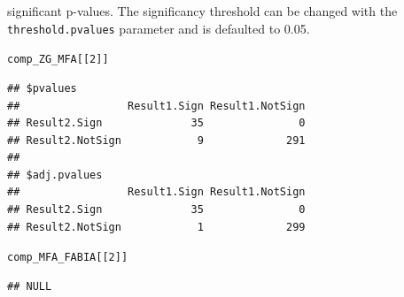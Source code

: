 \documentclass[a4paper]{article}\usepackage[]{graphicx}\usepackage[]{color}
\makeatletter
\newcommand{\hlnum}[1]{\textcolor[rgb]{0.686,0.059,0.569}{#1}}%
\newcommand{\hlstd}[1]{\textcolor[rgb]{0.345,0.345,0.345}{#1}}%
\newenvironment{kframe}{%
 \def\at@end@of@kframe{}%
 \ifinner\ifhmode%
  \def\at@end@of@kframe{\end{minipage}}%
  \begin{minipage}{\columnwidth}%
 \fi\fi%
 \def\FrameCommand##1{\hskip\@totalleftmargin \hskip-\fboxsep
 \colorbox{shadecolor}{##1}\hskip-\fboxsep
     \hskip-\linewidth \hskip-\@totalleftmargin \hskip\columnwidth}%
 \MakeFramed {\advance\hsize-\width
   \@totalleftmargin\z@ \linewidth\hsize
   \@setminipage}}%
 {\par\unskip\endMakeFramed%
 \at@end@of@kframe}
\newenvironment{knitrout}{}{} %
\makeatother
\begin{document}
significant p-values. The significancy threshold can be changed with the
\texttt{threshold.pvalues} parameter and is defaulted to 0.05.
\begin{knitrout}
\color{fgcolor}\begin{kframe}
\begin{alltt}
\hlstd{comp_ZG_MFA[[}\hlnum{2}\hlstd{]]}
\end{alltt}
\begin{verbatim}
## $pvalues
##                 Result1.Sign Result1.NotSign
## Result2.Sign              35               0
## Result2.NotSign            9             291
## 
## $adj.pvalues
##                 Result1.Sign Result1.NotSign
## Result2.Sign              35               0
## Result2.NotSign            1             299
\end{verbatim}
\begin{alltt}
\hlstd{comp_MFA_FABIA[[}\hlnum{2}\hlstd{]]}
\end{alltt}
\begin{verbatim}
## NULL
\end{verbatim}
\end{kframe}
\end{knitrout}

\newpage
\nocite{*}


\end{document}
